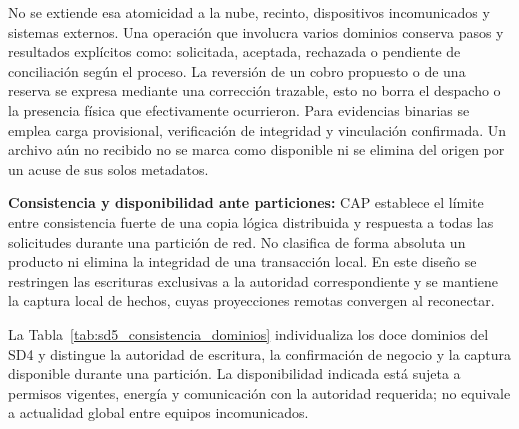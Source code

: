 No se extiende esa atomicidad a la nube, recinto, dispositivos incomunicados y sistemas externos. Una operación que involucra varios dominios conserva pasos y resultados explícitos como: solicitada, aceptada, rechazada o pendiente de conciliación según el proceso. La reversión de un cobro propuesto o de una reserva se expresa mediante una corrección trazable, esto no borra el despacho o la presencia física que efectivamente ocurrieron. Para evidencias binarias se emplea carga provisional, verificación de integridad y vinculación confirmada. Un archivo aún no recibido no se marca como disponible ni se elimina del origen por un acuse de sus solos metadatos.

\textbf{Consistencia y disponibilidad ante particiones:} CAP establece el límite entre consistencia fuerte de una copia lógica distribuida y respuesta a todas las solicitudes durante una partición de red. No clasifica de forma absoluta un producto ni elimina la integridad de una transacción local. En este diseño se restringen las escrituras exclusivas a la autoridad correspondiente y se mantiene la captura local de hechos, cuyas proyecciones remotas convergen al reconectar.

La Tabla~\ref{tab:sd5_consistencia_dominios} individualiza los doce dominios del SD4 y distingue la autoridad de escritura, la confirmación de negocio y la captura disponible durante una partición. La disponibilidad indicada está sujeta a permisos vigentes, energía y comunicación con la autoridad requerida; no equivale a actualidad global entre equipos incomunicados.

